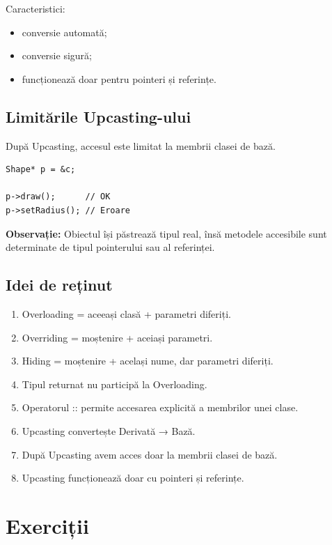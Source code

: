 \documentclass[12pt,a4paper]{article}
\begin{document}
Caracteristici:

\begin{itemize}
\item conversie automată;
\item conversie sigură;
\item funcționează doar pentru pointeri și referințe.
\end{itemize}

\subsection{Limitările Upcasting-ului}

După Upcasting, accesul este limitat la membrii clasei de bază.

\begin{verbatim}
Shape* p = &c;

p->draw();      // OK
p->setRadius(); // Eroare
\end{verbatim}

\textbf{Observație:} Obiectul își păstrează tipul real, însă metodele accesibile sunt determinate de tipul pointerului sau al referinței.

\subsection{Idei de reținut}

\begin{enumerate}
\item Overloading = aceeași clasă + parametri diferiți.
\item Overriding = moștenire + aceiași parametri.
\item Hiding = moștenire + același nume, dar parametri diferiți.
\item Tipul returnat nu participă la Overloading.
\item Operatorul :: permite accesarea explicită a membrilor unei clase.
\item Upcasting convertește Derivată → Bază.
\item După Upcasting avem acces doar la membrii clasei de bază.
\item Upcasting funcționează doar cu pointeri și referințe.
\end{enumerate}


\section{Exerciții}
\end{document}
